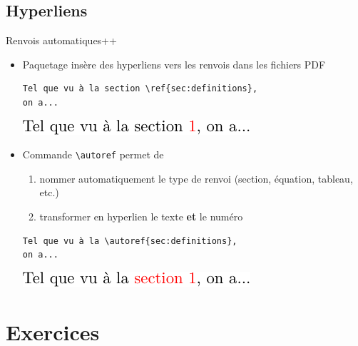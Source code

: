 \subsection{Hyperliens}

Renvois automatiques++

\begin{itemize}
\item Paquetage  insère des hyperliens vers les renvois
  dans les fichiers PDF
  \begin{demo}
\begin{lstlisting}
Tel que vu à la section \ref{sec:definitions},
on a...
\end{lstlisting}
    \begin{framed}
      \includegraphics{renvoi_avec_ref}
    \end{framed}
  \end{demo}
\item Commande \verb=\autoref= permet de
  \begin{enumerate}
  \item nommer automatiquement le type de renvoi (section, équation,
    tableau, etc.)
  \item transformer en hyperlien le texte \textbf{et} le numéro
  \end{enumerate}
  \begin{demo}
\begin{lstlisting}
Tel que vu à la \autoref{sec:definitions},
on a...
\end{lstlisting}
    \begin{framed}
      \includegraphics{renvoi_avec_autoref}
    \end{framed}
  \end{demo}
\end{itemize}





\section{Exercices}
\label{sec:apparence:exercices}

